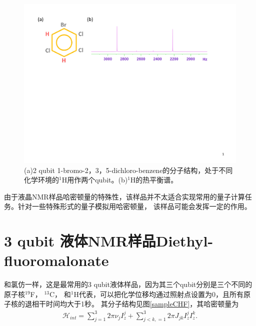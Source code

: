 \begin{figure}[htbp]
            \begin{center}
              \includegraphics[width= 0.8\columnwidth]{figures/samplelq2.pdf}
              \caption{(a)2 qubit 1-bromo-2，3，5-dichloro-benzene的分子结构，处于不同化学环境的$^{1}$H用作两个qubit。(b)$^1$H的热平衡谱。}
              \label{samplelq2}
            \end{center}
\end{figure}

由于液晶NMR样品哈密顿量的特殊性，该样品并不太适合实现常用的量子计算任务。针对一些特殊形式的量子模拟用哈密顿量，
该样品可能会发挥一定的作用。

\section{3 qubit 液体NMR样品Diethyl-fluoromalonate}

和氯仿一样，这是最常用的3 qubit液体样品，因为其三个qubit分别是三个不同的原子核$^{19}$F， $^{13}$C， 和$^1$H代表，可以把化学位移均通过照射点设置为0，且所有原子核的退相干时间均大于1秒。
其分子结构见图\ref{sampleCHF}，其哈密顿量为
\begin{eqnarray}
\mathcal{H}_{int}=\sum\limits_{j=1}^3 {2\pi \nu _j } I_z^j  + \sum\limits_{j < k,=1}^3 {2\pi} J_{jk} I_z^j I_z^k.
\end{eqnarray}

